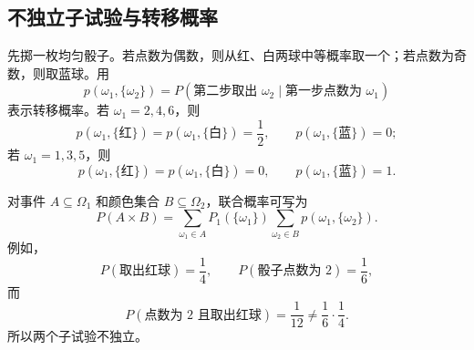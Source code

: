 \subsection*{不独立子试验与转移概率}

\begin{example}[掷骰子后按点数取球]
先掷一枚均匀骰子。若点数为偶数，则从红、白两球中等概率取一个；若点数为奇数，则取蓝球。用
\[
p(\omega_1,\{\omega_2\})
=P(\text{第二步取出 }\omega_2\mid\text{第一步点数为 }\omega_1)
\]
表示转移概率。若 $\omega_1=2,4,6$，则
\[
p(\omega_1,\{\text{红}\})=p(\omega_1,\{\text{白}\})=\frac12,
\qquad
p(\omega_1,\{\text{蓝}\})=0;
\]
若 $\omega_1=1,3,5$，则
\[
p(\omega_1,\{\text{红}\})=p(\omega_1,\{\text{白}\})=0,
\qquad
p(\omega_1,\{\text{蓝}\})=1.
\]

对事件 $A\subseteq\Omega_1$ 和颜色集合 $B\subseteq\Omega_2$，联合概率可写为
\[
P(A\times B)
=\sum_{\omega_1\in A}P_1(\{\omega_1\})
\sum_{\omega_2\in B}p(\omega_1,\{\omega_2\}).
\]
例如，
\[
P(\text{取出红球})=\frac14,
\qquad
P(\text{骰子点数为 }2)=\frac16,
\]
而
\[
P(\text{点数为 }2\text{ 且取出红球})=\frac1{12}
\ne\frac16\cdot\frac14.
\]
所以两个子试验不独立。
\end{example}

